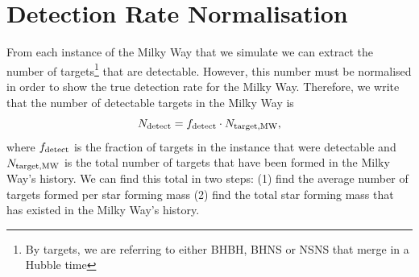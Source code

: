 \documentclass[twocolumn]{aastex63}
\begin{document}
\section{Detection Rate Normalisation}\label{app:rate_normalisation}
From each instance of the Milky Way that we simulate we can extract the number of targets\footnote{By targets, we are referring to either BHBH, BHNS or NSNS that merge in a Hubble time} that are detectable. However, this number must be normalised in order to show the true detection rate for the Milky Way. Therefore, we write that the number of detectable targets in the Milky Way is
\begin{equation}\label{eq:norm_frame}
    N_{\rm detect} = f_{\rm detect} \cdot N_{\rm target, MW},
\end{equation}
where $f_{\rm detect}$ is the fraction of targets in the instance that were detectable and $N_{\rm target, MW}$ is the total number of targets that have been formed in the Milky Way's history. We can find this total in two steps: (1) find the average number of targets formed per star forming mass (2) find the total star forming mass that has existed in the Milky Way's history.
\end{document}
